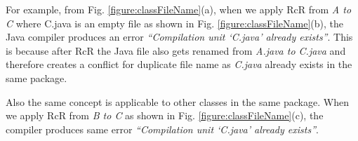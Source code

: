 For example, from Fig. \ref{figure:classFileName}(a), when we apply RcR from \emph{A to C} where C.java is an empty file as shown in Fig. \ref{figure:classFileName}(b), the Java compiler produces an error \textit{``Compilation unit `C.java' already exists''}. This is because after RcR the Java file also gets renamed from \emph{A.java to C.java} and therefore creates a conflict for duplicate file name as \emph{C.java} already exists in the same package. 

Also the same concept is applicable to other classes in the same package. When we apply RcR from \emph{B to C} as shown in Fig. \ref{figure:classFileName}(c), the compiler produces same error \textit{``Compilation unit `C.java' already exists''}.  



